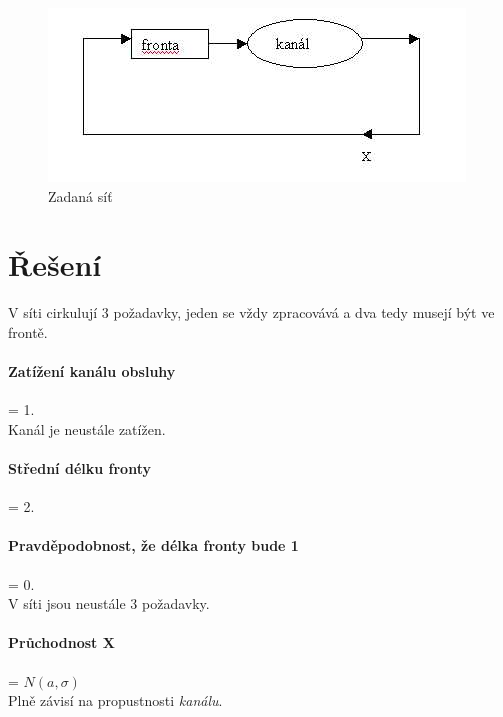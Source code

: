 \documentclass[12pt, a4paper]{article}
\begin{document}
\begin{figure}[h]
	\centering
	\includegraphics[width=0.7\linewidth]{net}
	\caption{Zadaná síť}
	\label{fig:net}
\end{figure}

\section*{Řešení}
V síti cirkulují 3 požadavky, jeden se vždy zpracovává a dva tedy musejí být ve frontě.

\paragraph{Zatížení kanálu obsluhy} = 1. \\
Kanál je neustále zatížen.

\paragraph{Střední délku fronty} = 2.

\paragraph{Pravděpodobnost, že délka fronty bude 1} = 0. \\
V síti jsou neustále 3 požadavky.

\paragraph{Průchodnost X} = $N(a , \sigma)$ \\
Plně závisí na propustnosti \emph{kanálu}.
\end{document}
